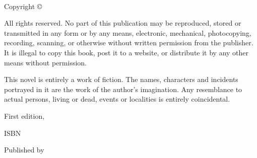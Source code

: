 
{\small
\setlength{\parindent}{0em}\setlength{\parskip}{1em}

~

\vfill

Copyright \copyright{} \editionyear{} \authorname

All rights reserved. No part of this publication may be reproduced, stored or transmitted in any form or by any means, electronic, mechanical, photocopying, recording, scanning, or otherwise without written permission from the publisher. It is illegal to copy this book, post it to a website, or distribute it by any other means without permission.

This novel is entirely a work of fiction. The names, characters and incidents portrayed in it are the work of the author’s imagination. Any resemblance to actual persons, living or dead, events or localities is entirely coincidental.

First edition, \editionyear{}

ISBN \isbn{}  %

Published by \publisher{}
}
